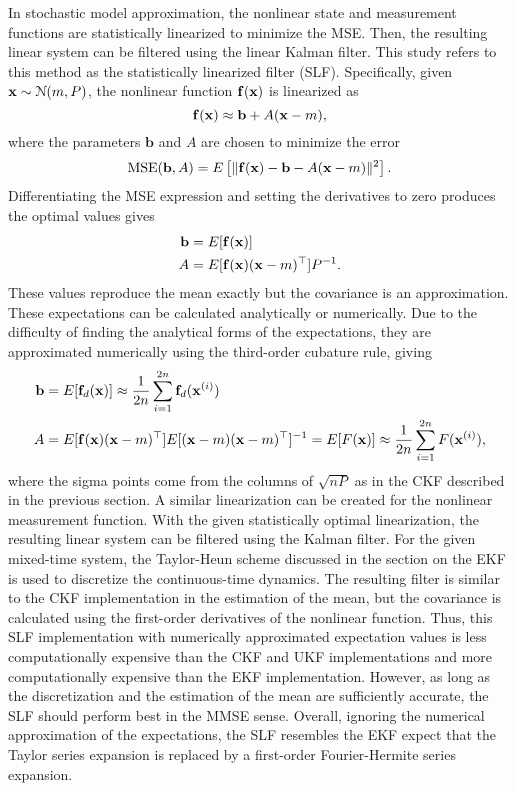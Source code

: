 \documentclass[../zhang_thesis.tex]{subfiles}
\begin{document}
In stochastic model approximation, the nonlinear state and measurement functions are statistically linearized to minimize the MSE. Then, the resulting linear system can be filtered using the linear Kalman filter. This study refers to this method as the statistically linearized filter (SLF). Specifically, given $\mathbf{x}\sim\mathcal{N}(m,P)$, the nonlinear function $\mathbf{f}(\mathbf{x})$ is linearized as
\begin{equation}
    \mathbf{f}(\mathbf{x}) \approx \mathbf{b} + A (\mathbf{x} - m),
\end{equation}
where the parameters $\mathbf{b}$ and $A$ are chosen to minimize the error
\begin{equation}
    \text{MSE}(\mathbf{b},A) = E \left[ \| \mathbf{f}(\mathbf{x}) - \mathbf{b} - A(\mathbf{x}-m) \|^2 \right].
\end{equation}
Differentiating the MSE expression and setting the derivatives to zero produces the optimal values gives
\begin{align}
    \mathbf{b} & = E[\mathbf{f}(\mathbf{x})] \\
    A & = E[\mathbf{f}(\mathbf{x}) (\mathbf{x}-m)^\top] P^{-1}.
\end{align}
These values reproduce the mean exactly but the covariance is an approximation. These expectations can be calculated analytically or numerically. Due to the difficulty of finding the analytical forms of the expectations, they are approximated numerically using the third-order cubature rule, giving
\begin{align}
    \mathbf{b} & = E[\mathbf{f}_d(\mathbf{x})] \approx \frac{1}{2n} \sum_{i=1}^{2n} \mathbf{f}_d(\mathbf{x}^{(i)}) \\
    A & = E[\mathbf{f}(\mathbf{x})(\mathbf{x}-m)^\top] E[(\mathbf{x}-m)(\mathbf{x}-m)^\top]^{-1} = E[F(\mathbf{x})] \approx \frac{1}{2n} \sum_{i=1}^{2n} F(\mathbf{x}^{(i)}),
\end{align}
where the sigma points come from the columns of $\sqrt{nP}$ as in the CKF described in the previous section. A similar linearization can be created for the nonlinear measurement function. With the given statistically optimal linearization, the resulting linear system can be filtered using the Kalman filter. For the given mixed-time system, the Taylor-Heun scheme discussed in the section on the EKF is used to discretize the continuous-time dynamics. The resulting filter is similar to the CKF implementation in the
estimation of the mean, but the covariance is calculated using the first-order derivatives of the nonlinear function. Thus, this SLF implementation with numerically approximated expectation values is less computationally expensive than the CKF and UKF implementations and more computationally expensive than the EKF implementation. However, as long as the discretization and the estimation of the mean are sufficiently accurate, the SLF should perform best in the MMSE sense. Overall,
ignoring the numerical approximation of the expectations, the SLF resembles the EKF expect that the Taylor series expansion is replaced by a first-order Fourier-Hermite series expansion.
\end{document}

